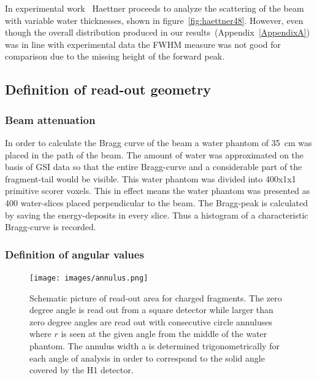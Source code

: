 In experimental work~\cite{ehaettner} Haettner proceeds to analyze the scattering of the beam with variable water thicknesses, shown in figure~\ref{fig:haettner48}. However, even though the overall distribution produced in our results~(Appendix~\ref{AppendixA}) was in line with experimental data the FWHM measure was not good for comparison due to the missing height of the forward peak.


\subsection{Definition of read-out geometry}

\subsubsection{Beam attenuation}

In order to calculate the Bragg curve of the beam a water phantom of 35~cm was placed in the path of the beam. The amount of water was approximated on the basis of GSI data so that the entire Bragg-curve and a considerable part of the fragment-tail would be visible. This water phantom was divided into 400x1x1 primitive scorer voxels. This in effect means the water phantom was presented as 400 water-slices placed perpendicular to the beam. The Bragg-peak is calculated by saving the energy-deposits in every slice. Thus a histogram of a characteristic Bragg-curve is recorded.

\subsubsection{Definition of angular values\label{AngularDistributionText}}

\begin{figure}[!h] 
\begin{center}
\texttt{[image: images/annulus.png]}  
\caption{\label{fig:annulusesExplained} Schematic picture of read-out area for charged fragments. The zero degree angle is read out from a square detector while larger than zero degree angles are read out with consecutive circle annuluses where $r$ is seen at the given angle from the middle of the water phantom. The annulus width a is determined trigonometrically for each angle of analysis in order to correspond to the solid angle covered by the H1 detector.}
\end{center}
\end{figure}

